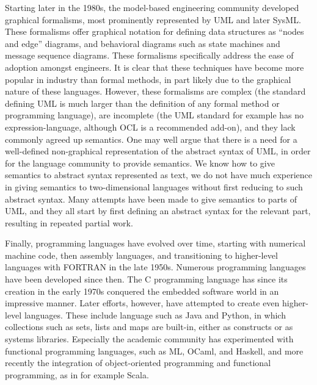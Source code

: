 Starting later in the 1980s, the model-based 
engineering community developed graphical formalisms, most 
prominently represented by UML and later SysML. These formalisms 
offer graphical notation for defining data structures as ``nodes 
and edge'' diagrams, and behavioral diagrams such as state machines 
and message sequence diagrams. These formalisms specifically 
address the ease of adoption amongst engineers. It is clear that
these techniques have become more popular in industry than formal 
methods, in part likely due to the graphical nature of 
these languages. However, these formalisms are complex (the 
standard defining UML is much larger than the definition of any 
formal method or programming language), are incomplete (the UML
standard for example has no expression-language, although OCL is
a recommended add-on), and they lack commonly agreed up semantics. 
One may well argue that there is a need for a 
well-defined non-graphical representation of the abstract syntax
of UML, in order for the language community to provide 
semantics. We know how to give semantics to abstract syntax
represented as text, we do not have much experience in giving semantics to two-dimensional languages without first reducing to such abstract syntax.
%
Many attempts have been made to give semantics to parts of UML,
and they all start by first defining an abstract syntax for the
relevant part, resulting in repeated partial work.

Finally, programming languages have evolved over time, starting 
with numerical machine code, then assembly languages, and 
transitioning to higher-level languages with FORTRAN in the late 
1950s. Numerous programming languages have been developed since 
then. The C programming language has  since its creation in the 
early 1970s conquered the embedded software world in an 
impressive manner. Later efforts, however, have attempted to
create even higher-level languages. These include language such as
Java and Python, in which collections such as sets, lists and maps 
are built-in, either as constructs or as systems libraries. 
Especially the academic community has experimented with functional 
programming languages, such as ML, OCaml, and Haskell, and more 
recently the integration of object-oriented programming and 
functional programming, as in for example Scala.


